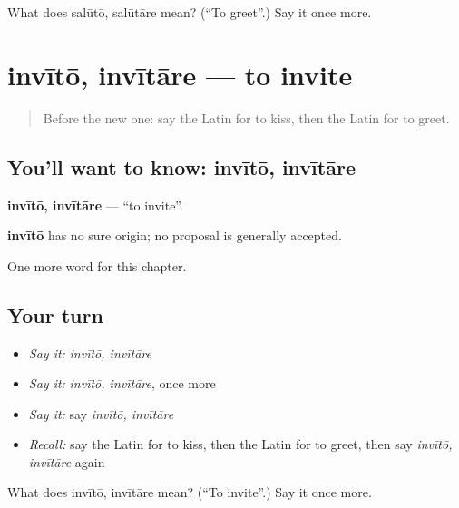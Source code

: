 \begin{tcolorbox}[breakable,colback=teal!4,colframe=teal!35!black,title={Before you move on}]
What does salūtō, salūtāre mean? (\textquotedblleft{}To greet\textquotedblright{}.) Say it once more.
\end{tcolorbox}
\section[invītō, invītāre]{invītō, invītāre — to invite}

\label{lesson:LA-C197-invito}



\begin{quote}
Before the new one: say the Latin for to kiss, then the Latin for to greet.
\end{quote}

\subsection*{You'll want to know: invītō, invītāre}
\textbf{invītō, invītāre} — \textquotedblleft{}to invite\textquotedblright{}.

\begin{cousinweb}
\textbf{invītō} has no sure origin; no proposal is generally accepted.
\end{cousinweb}

\begin{grammarlens}[title={What you've built}]
One more word for this chapter.
\end{grammarlens}

\subsection*{Your turn}
\begin{itemize}
\raggedright
  \item \emph{Say it:} \emph{invītō, invītāre}
  \item \emph{Say it:} \emph{invītō, invītāre}, once more
  \item \emph{Say it:} say \emph{invītō, invītāre}
  \item \emph{Recall:} say the Latin for to kiss, then the Latin for to greet, then say \emph{invītō, invītāre} again
\end{itemize}

\begin{tcolorbox}[breakable,colback=teal!4,colframe=teal!35!black,title={Before you move on}]
What does invītō, invītāre mean? (\textquotedblleft{}To invite\textquotedblright{}.) Say it once more.
\end{tcolorbox}
